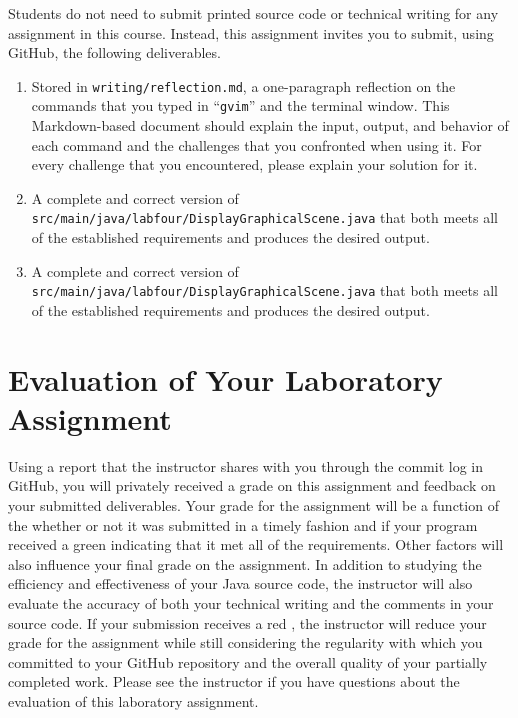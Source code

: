 \documentclass[11pt]{article}
\newcommand{\mainprogramsource}{\lstinline{src/main/java/labfour/DisplayGraphicalScene.java}}
\newcommand{\secondprogramsource}{\lstinline{src/main/java/labfour/DisplayGraphicalScene.java}}
\newcommand{\reflection}{\lstinline{writing/reflection.md}}
\newcommand{\command}[1]{``\lstinline{#1}''}
\newcommand{\checkmark}{\ding{51}}
\newcommand{\naughtmark}{\ding{55}}
\begin{document}
\noindent Students do not need to submit printed source code or technical writing for any assignment in this course.
Instead, this assignment invites you to submit, using GitHub, the following deliverables.

\begin{enumerate}

  \setlength{\itemsep}{0in}

\item Stored in \reflection{}, a one-paragraph reflection on the commands that you typed in \command{gvim} and the
  terminal window. This Markdown-based document should explain the input, output, and behavior of each command and the
  challenges that you confronted when using it. For every challenge that you encountered, please explain your solution
  for it.

\item A complete and correct version of \mainprogramsource{} that both meets all of the established requirements and
  produces the desired output.

\item A complete and correct version of \secondprogramsource{} that both meets all of the established requirements and
  produces the desired output.

\end{enumerate}

\section*{Evaluation of Your Laboratory Assignment}

Using a report that the instructor shares with you through the commit log in GitHub, you will privately received a grade
on this assignment and feedback on your submitted deliverables. Your grade for the assignment will be a function of the
whether or not it was submitted in a timely fashion and if your program received a green \checkmark{} indicating that it
met all of the requirements. Other factors will also influence your final grade on the assignment. In addition to
studying the efficiency and effectiveness of your Java source code, the instructor will also evaluate the accuracy of
both your technical writing and the comments in your source code. If your submission receives a red \naughtmark{}, the
instructor will reduce your grade for the assignment while still considering the regularity with which you committed to
your GitHub repository and the overall quality of your partially completed work. Please see the instructor if you have
questions about the evaluation of this laboratory assignment.
\end{document}
